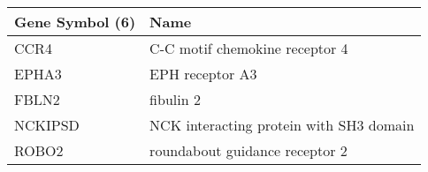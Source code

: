\begin{tabular}{ll}
\toprule
Gene Symbol (6) &                                    Name \\
\midrule
           CCR4 &          C-C motif chemokine receptor 4 \\
          EPHA3 &                         EPH receptor A3 \\
          FBLN2 &                               fibulin 2 \\
        NCKIPSD & NCK interacting protein with SH3 domain \\
          ROBO2 &          roundabout guidance receptor 2 \\
\bottomrule
\end{tabular}
